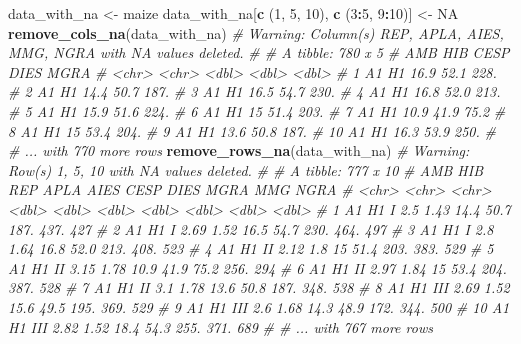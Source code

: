 \documentclass[
]{book}
\newenvironment{Shaded}{\begin{snugshade}}{\end{snugshade}}
\newcommand{\CommentTok}[1]{\textcolor[rgb]{0.56,0.35,0.01}{\textit{#1}}}
\newcommand{\DecValTok}[1]{\textcolor[rgb]{0.00,0.00,0.81}{#1}}
\newcommand{\KeywordTok}[1]{\textcolor[rgb]{0.13,0.29,0.53}{\textbf{#1}}}
\newcommand{\NormalTok}[1]{#1}
\newcommand{\OperatorTok}[1]{\textcolor[rgb]{0.81,0.36,0.00}{\textbf{#1}}}
\newcommand{\OtherTok}[1]{\textcolor[rgb]{0.56,0.35,0.01}{#1}}
\newcommand{\StringTok}[1]{\textcolor[rgb]{0.31,0.60,0.02}{#1}}
\numberwithin{equation}{section}
\begin{document}
\begin{Shaded}
\begin{Highlighting}[]
\NormalTok{data\_with\_na \textless{}{-}}\StringTok{ }\NormalTok{maize}
\NormalTok{data\_with\_na[}\KeywordTok{c}\NormalTok{ (}\DecValTok{1}\NormalTok{, }\DecValTok{5}\NormalTok{, }\DecValTok{10}\NormalTok{), }\KeywordTok{c}\NormalTok{ (}\DecValTok{3}\OperatorTok{:}\DecValTok{5}\NormalTok{, }\DecValTok{9}\OperatorTok{:}\DecValTok{10}\NormalTok{)] \textless{}{-}}\StringTok{ }\OtherTok{NA}
\KeywordTok{remove\_cols\_na}\NormalTok{(data\_with\_na)}
\CommentTok{\# Warning: Column(s) REP, APLA, AIES, MMG, NGRA with NA values deleted.}
\CommentTok{\# \# A tibble: 780 x 5}
\CommentTok{\#    AMB   HIB    CESP  DIES  MGRA}
\CommentTok{\#    \textless{}chr\textgreater{} \textless{}chr\textgreater{} \textless{}dbl\textgreater{} \textless{}dbl\textgreater{} \textless{}dbl\textgreater{}}
\CommentTok{\#  1 A1    H1     16.9  52.1 228. }
\CommentTok{\#  2 A1    H1     14.4  50.7 187. }
\CommentTok{\#  3 A1    H1     16.5  54.7 230. }
\CommentTok{\#  4 A1    H1     16.8  52.0 213. }
\CommentTok{\#  5 A1    H1     15.9  51.6 224. }
\CommentTok{\#  6 A1    H1     15    51.4 203. }
\CommentTok{\#  7 A1    H1     10.9  41.9  75.2}
\CommentTok{\#  8 A1    H1     15    53.4 204. }
\CommentTok{\#  9 A1    H1     13.6  50.8 187. }
\CommentTok{\# 10 A1    H1     16.3  53.9 250. }
\CommentTok{\# \# ... with 770 more rows}
\KeywordTok{remove\_rows\_na}\NormalTok{(data\_with\_na)}
\CommentTok{\# Warning: Row(s) 1, 5, 10 with NA values deleted.}
\CommentTok{\# \# A tibble: 777 x 10}
\CommentTok{\#    AMB   HIB   REP    APLA  AIES  CESP  DIES  MGRA   MMG  NGRA}
\CommentTok{\#    \textless{}chr\textgreater{} \textless{}chr\textgreater{} \textless{}chr\textgreater{} \textless{}dbl\textgreater{} \textless{}dbl\textgreater{} \textless{}dbl\textgreater{} \textless{}dbl\textgreater{} \textless{}dbl\textgreater{} \textless{}dbl\textgreater{} \textless{}dbl\textgreater{}}
\CommentTok{\#  1 A1    H1    I      2.5   1.43  14.4  50.7 187.   437.   427}
\CommentTok{\#  2 A1    H1    I      2.69  1.52  16.5  54.7 230.   464.   497}
\CommentTok{\#  3 A1    H1    I      2.8   1.64  16.8  52.0 213.   408.   523}
\CommentTok{\#  4 A1    H1    II     2.12  1.8   15    51.4 203.   383.   529}
\CommentTok{\#  5 A1    H1    II     3.15  1.78  10.9  41.9  75.2  256.   294}
\CommentTok{\#  6 A1    H1    II     2.97  1.84  15    53.4 204.   387.   528}
\CommentTok{\#  7 A1    H1    II     3.1   1.78  13.6  50.8 187.   348.   538}
\CommentTok{\#  8 A1    H1    III    2.69  1.52  15.6  49.5 195.   369.   529}
\CommentTok{\#  9 A1    H1    III    2.6   1.68  14.3  48.9 172.   344.   500}
\CommentTok{\# 10 A1    H1    III    2.82  1.52  18.4  54.3 255.   371.   689}
\CommentTok{\# \# ... with 767 more rows}
\end{Highlighting}
\end{Shaded}
\end{document}
